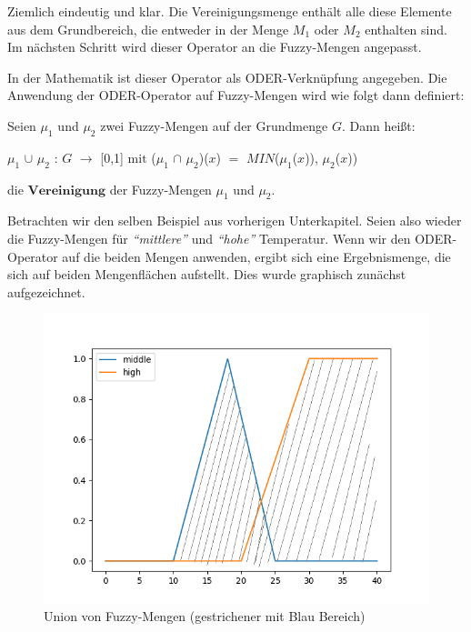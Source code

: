 Ziemlich eindeutig und klar. Die Vereinigungsmenge enthält alle diese Elemente aus dem Grundbereich, die entweder in der Menge $M_1$ oder $M_2$ enthalten sind. Im nächsten Schritt wird dieser Operator an die Fuzzy-Mengen angepasst.

In der Mathematik ist dieser Operator als ODER-Verknüpfung angegeben. Die Anwendung der ODER-Operator auf Fuzzy-Mengen wird wie folgt dann definiert:


\begin{definition}
	Seien $\mu_1$ und $\mu_2$ zwei Fuzzy-Mengen auf der Grundmenge $G$. Dann heißt:
	\begin{center}
		$\mu_1$ $\cup$ $\mu_2$ : $G$ $\rightarrow$ [0,1] $\text{mit}$  ($\mu_1$ $\cap$ $\mu_2$)($x$) $=$ $MIN$($\mu_1$($x$)), $\mu_2$($x$)) 
	\end{center}
	die $\textbf{Vereinigung}$ der Fuzzy-Mengen $\mu_1$ und $\mu_2$.
\end{definition}

Betrachten wir den selben Beispiel aus vorherigen Unterkapitel. Seien also wieder die Fuzzy-Mengen für \textit{``mittlere''} und \textit{``hohe''} Temperatur. Wenn wir den ODER-Operator auf die beiden Mengen anwenden, ergibt sich eine Ergebnismenge, die sich auf beiden Mengenflächen aufstellt. Dies wurde graphisch zunächst aufgezeichnet.

\begin{figure}[htbp]
	\centering
	\includegraphics[scale=0.5]{images/oder_mid_high_temp.png}
	\caption{Union von Fuzzy-Mengen (gestrichener mit Blau Bereich)}
\end{figure}\label{high_low_temp_union}

